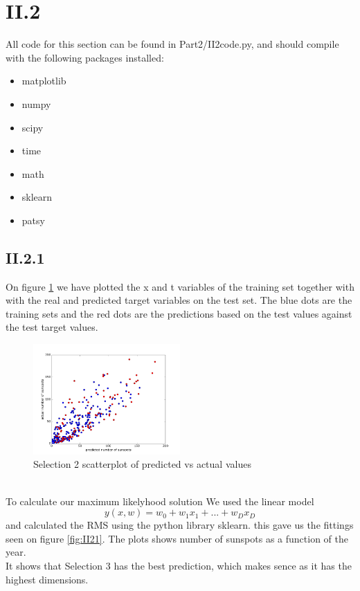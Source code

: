 \documentclass{article}
\begin{document}
\section{II.2}
All code for this section can be found in Part2/II2code.py, and should compile with the following packages installed:
\begin{itemize}
    \item matplotlib
    \item numpy
    \item scipy
    \item time
    \item math
    \item sklearn
    \item patsy
\end{itemize}

\subsection{II.2.1}

On figure \ref{fig:2scatter} we have plotted the x and t variables of the training set together with 
with the real and predicted target variables on the test set. The blue dots are the training sets and the
red dots are the predictions based on the test values against the test target values.
\begin{figure}[h!]
    \centering
    \includegraphics[width=0.5\textwidth]{Part2/II212Scatter.png}
    \caption{Selection 2 scatterplot of predicted vs actual values}
    \label{fig:2scatter}
\end{figure}\\
To calculate our maximum likelyhood solution We used the linear model
\begin{equation*}
    y(x, w) = w_0 + w_1 x_1 + ... + w_D x_D
\end{equation*}
and calculated the RMS using the python library sklearn. this gave us the fittings seen on 
figure \ref{fig:II21}. The plots shows number of sunspots as a function of the year.\\
It shows that Selection 3 has the best prediction, which makes sence as it has the highest dimensions.
\end{document}
